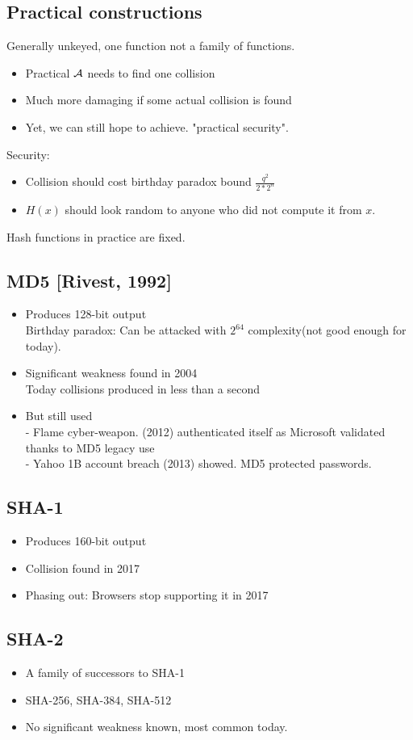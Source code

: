 \documentclass[12pt]{article}
\begin{document}
\subsection{Practical constructions}
Generally unkeyed, one function not a family of functions.
\begin{itemize}
\item Practical $\mathcal{A}$ needs to find one collision
\item Much more damaging if some actual collision is found
\item Yet, we can still hope to achieve. "practical security".
\end{itemize}
Security:
\begin{itemize}
\item Collision should cost birthday paradox bound $\frac{q^2}{2*2^n}$
\item $H(x)$ should look random to anyone who did not compute it from $x$.
\end{itemize}
Hash functions in practice are fixed.
\subsection{MD5 [Rivest, 1992]}
\begin{itemize}
\item Produces 128-bit output\\
Birthday paradox: Can be attacked with $2^{64}$ complexity(not good enough for today).
\item Significant weakness found in 2004\\
Today collisions produced in less than a second
\item But still used\\
- Flame cyber-weapon. (2012) authenticated itself as Microsoft validated thanks to MD5 legacy use\\
- Yahoo 1B account breach (2013) showed. MD5 protected passwords.
\end{itemize}
\subsection{SHA-1}
\begin{itemize}
\item Produces 160-bit output
\item Collision found in 2017
\item Phasing out: Browsers stop supporting it in 2017
\end{itemize}

\subsection{SHA-2}
\begin{itemize}
\item A family of successors to SHA-1
\item SHA-256, SHA-384, SHA-512
\item No significant weakness known, most common today.
\end{itemize}
\end{document}
